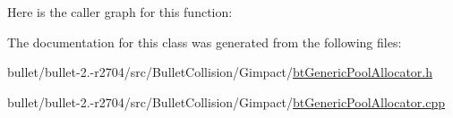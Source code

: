 Here is the caller graph for this function\+:




The documentation for this class was generated from the following files\+:\begin{DoxyCompactItemize}
\item 
bullet/bullet-\/2.-\/r2704/src/\+Bullet\+Collision/\+Gimpact/\hyperlink{bt_generic_pool_allocator_8h}{bt\+Generic\+Pool\+Allocator.\+h}\item 
bullet/bullet-\/2.-\/r2704/src/\+Bullet\+Collision/\+Gimpact/\hyperlink{bt_generic_pool_allocator_8cpp}{bt\+Generic\+Pool\+Allocator.\+cpp}\end{DoxyCompactItemize}
